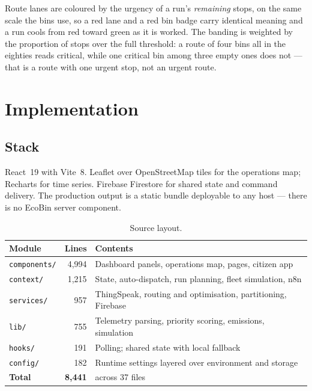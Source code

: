 \documentclass[11pt,a4paper]{article}
\begin{document}
Route lanes are coloured by the urgency of a run's \emph{remaining}
stops, on the same scale the bins use, so a red lane and a red bin badge
carry identical meaning and a run cools from red toward green as it is
worked. The banding is weighted by the proportion of stops over the full
threshold: a route of four bins all in the eighties reads critical, while
one critical bin among three empty ones does not --- that is a route with
one urgent stop, not an urgent route.

\section{Implementation}

\subsection{Stack}

React~19 with Vite~8. Leaflet over OpenStreetMap tiles for the operations
map; Recharts for time series. Firebase Firestore for shared state and
command delivery. The production output is a static bundle deployable to
any host --- there is no EcoBin server component.

\begin{table}[h]
\centering\small
\begin{tabularx}{\textwidth}{lrX}
\toprule
\textbf{Module} & \textbf{Lines} & \textbf{Contents} \\
\midrule
\texttt{components/} & 4{,}994 & Dashboard panels, operations map, pages, citizen app \\
\texttt{context/}    & 1{,}215 & State, auto-dispatch, run planning, fleet simulation, n8n \\
\texttt{services/}   & \phantom{0}957 & ThingSpeak, routing and optimisation, partitioning, Firebase \\
\texttt{lib/}        & \phantom{0}755 & Telemetry parsing, priority scoring, emissions, simulation \\
\texttt{hooks/}      & \phantom{0}191 & Polling; shared state with local fallback \\
\texttt{config/}     & \phantom{0}182 & Runtime settings layered over environment and storage \\
\midrule
\textbf{Total}       & \textbf{8{,}441} & across 37 files \\
\bottomrule
\end{tabularx}
\caption{Source layout.}
\end{table}
\end{document}
